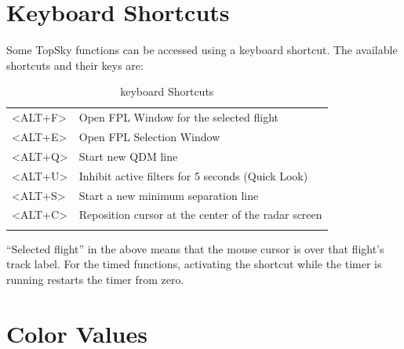 \documentclass[a4paper,oneside,11pt]{memoir}
\begin{document}
\section{Keyboard Shortcuts}

Some TopSky functions can be accessed using a keyboard shortcut. The available shortcuts and their keys are:

\begin{longtable}{p{2.5cm} p{10cm}}
  <ALT+F> & Open FPL Window for the selected flight              \\
  <ALT+E> & Open FPL Selection Window                            \\
  <ALT+Q> & Start new QDM line                                   \\
  <ALT+U> & Inhibit active filters for 5 seconds (Quick Look)    \\
  <ALT+S> & Start a new minimum separation line                  \\
  <ALT+C> & Reposition cursor at the center of the radar screen  \\  
  \caption{keyboard Shortcuts}  
\end{longtable}

“Selected flight” in the above means that the mouse cursor is over that flight’s track label. For the timed functions, activating the shortcut while the timer is running restarts the timer from zero.

\section{Color Values}
\end{document}
